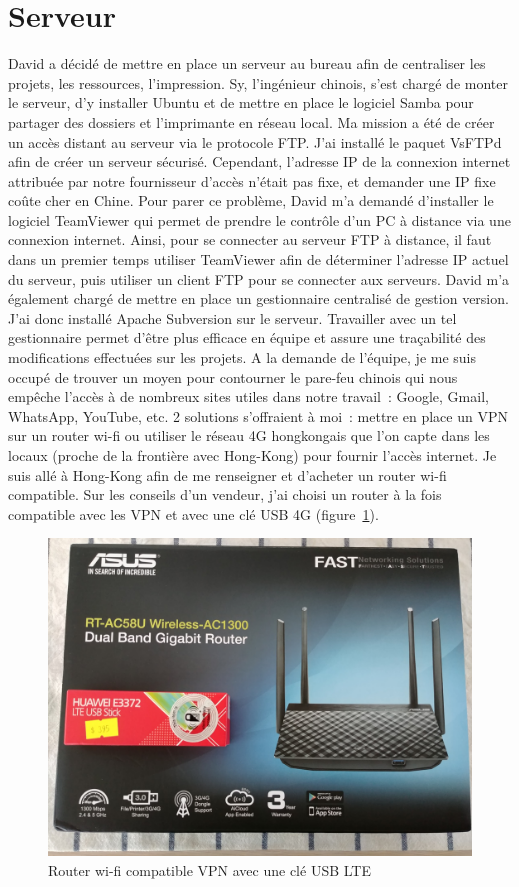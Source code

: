 \documentclass[a4paper, 12pt, sffamily]{report}
\begin{document}
\section{Serveur}
David a décidé de mettre en place un serveur au bureau afin de centraliser les projets, les ressources, l’impression. Sy, l’ingénieur chinois, s’est chargé de monter le serveur, d’y installer Ubuntu et de mettre en place le logiciel Samba pour partager des dossiers et l’imprimante en réseau local. Ma mission a été de créer un accès distant au serveur via le protocole FTP. J’ai installé le paquet VsFTPd afin de créer un serveur sécurisé. Cependant, l’adresse IP de la connexion internet attribuée par notre fournisseur d’accès n’était pas fixe, et demander une IP fixe coûte cher en Chine. Pour parer ce problème, David m’a demandé d’installer le logiciel TeamViewer qui permet de prendre le contrôle d’un PC à distance via une connexion internet. Ainsi, pour se connecter au serveur FTP à distance, il faut dans un premier temps utiliser TeamViewer afin de déterminer l’adresse IP actuel du serveur, puis utiliser un client FTP pour se connecter aux serveurs.
David m’a également chargé de mettre en place un gestionnaire centralisé de gestion version. J’ai donc installé Apache Subversion sur le serveur. Travailler avec un tel gestionnaire permet d’être plus efficace en équipe et assure une traçabilité des modifications effectuées sur les projets.
A la demande de l’équipe, je me suis occupé de trouver un moyen pour contourner le pare-feu chinois qui nous empêche l’accès à de nombreux sites utiles dans notre travail~: Google, Gmail, WhatsApp, YouTube, etc. 2 solutions s’offraient à moi~: mettre en place un VPN sur un router wi-fi ou utiliser le réseau 4G hongkongais que l’on capte dans les locaux (proche de la frontière avec Hong-Kong) pour fournir l’accès internet. Je suis allé à Hong-Kong afin de me renseigner et d’acheter un router wi-fi compatible. Sur les conseils d’un vendeur, j’ai choisi un router à la fois compatible avec les VPN et avec une clé USB 4G (figure~\ref{fig:wifi_router}).

\begin{figure}[H]
\centering
\includegraphics[scale=0.12]{figures/photos/wifi_router.jpg}
\caption{Router wi-fi compatible VPN avec une clé USB LTE}
\label{fig:wifi_router}
\end{figure}
\end{document}
